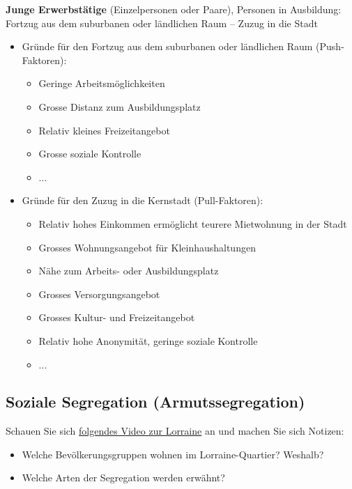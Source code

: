 \begin{myexercise}
\begin{myanswer}
\textbf{Junge Erwerbstätige} (Einzelpersonen oder Paare), Personen in Ausbildung: Fortzug aus dem suburbanen oder ländlichen Raum – Zuzug in die Stadt
    \begin{itemize}
        \item Gründe für den Fortzug aus dem suburbanen oder ländlichen Raum (Push-Faktoren):
        \begin{itemize}
            \item Geringe Arbeitsmöglichkeiten
            \item Grosse Distanz zum Ausbildungsplatz
            \item Relativ kleines Freizeitangebot
            \item Grosse soziale Kontrolle
            \item ...
        \end{itemize}
        \item Gründe für den Zuzug in die Kernstadt (Pull-Faktoren):
        \begin{itemize}
            \item Relativ hohes Einkommen ermöglicht teurere Mietwohnung in der Stadt
            \item Grosses Wohnungsangebot für Kleinhaushaltungen
            \item Nähe zum Arbeits- oder Ausbildungsplatz
            \item Grosses Versorgungsangebot
            \item Grosses Kultur- und Freizeitangebot
            \item Relativ hohe Anonymität, geringe soziale Kontrolle
            \item ...
        \end{itemize}
    \end{itemize}
\end{myanswer}

\end{myexercise}

\subsection{Soziale Segregation (Armutssegregation)}
\begin{mychallenge}
Schauen Sie sich \href{https://www.srf.ch/play/tv/bericht-vor-8/video/lorraine-quartier-bern?urn=urn:srf:video:0f1c7427-65b7-4ebf-a9ff-c595d08ba1df}{folgendes Video zur Lorraine} an und machen Sie sich Notizen:
\begin{itemize}
\item Welche Bevölkerungsgruppen wohnen im Lorraine-Quartier? Weshalb?
\item Welche Arten der Segregation werden erwähnt?
\end{itemize}

\end{mychallenge}


